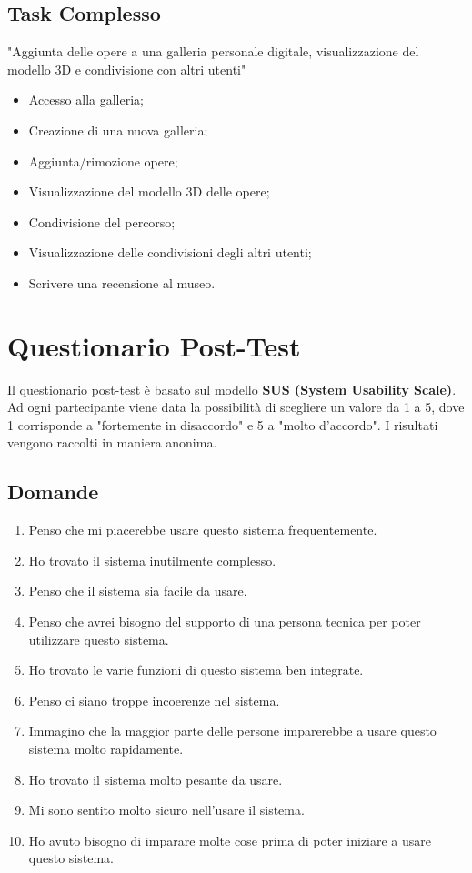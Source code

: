 \documentclass{article}
\begin{document}
\subsection*{Task Complesso}
"Aggiunta delle opere a una galleria personale digitale, visualizzazione del modello 3D e condivisione con altri utenti"
\begin{itemize}
    \item Accesso alla galleria;
    \item Creazione di una nuova galleria;
    \item Aggiunta/rimozione opere;
    \item Visualizzazione del modello 3D delle opere;
    \item Condivisione del percorso;
    \item Visualizzazione delle condivisioni degli altri utenti;
    \item Scrivere una recensione al museo.
\end{itemize}

\section{Questionario Post-Test}
Il questionario post-test \`e basato sul modello \textbf{SUS (System Usability Scale)}. Ad ogni partecipante viene data la possibilit\`a di scegliere un valore da 1 a 5, dove 1 corrisponde a "fortemente in disaccordo" e 5 a "molto d’accordo". I risultati vengono raccolti in maniera anonima.

\subsection*{Domande}
\begin{enumerate}
    \item Penso che mi piacerebbe usare questo sistema frequentemente.
    \item Ho trovato il sistema inutilmente complesso.
    \item Penso che il sistema sia facile da usare.
    \item Penso che avrei bisogno del supporto di una persona tecnica per poter utilizzare questo sistema.
    \item Ho trovato le varie funzioni di questo sistema ben integrate.
    \item Penso ci siano troppe incoerenze nel sistema.
    \item Immagino che la maggior parte delle persone imparerebbe a usare questo sistema molto rapidamente.
    \item Ho trovato il sistema molto pesante da usare.
    \item Mi sono sentito molto sicuro nell'usare il sistema.
    \item Ho avuto bisogno di imparare molte cose prima di poter iniziare a usare questo sistema.
\end{enumerate}
\end{document}
